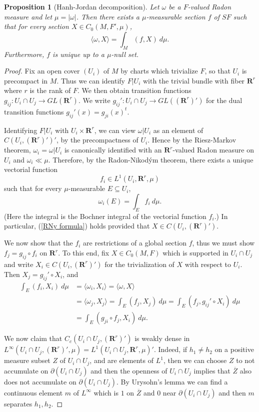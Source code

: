 \documentclass[reqno,12pt,letterpaper]{amsart}
\newcommand{\RR}{\mathbf{R}}
\newtheorem{proposition}[theorem]{Proposition}
\theoremstyle{definition}
\numberwithin{equation}{section}
\begin{document}
\begin{proposition}[Hanh-Jordan decomposition]
Let $\omega$ be a $F$-valued Radon measure and let $\mu = |\omega|$.
Then there exists a $\mu$-measurable section $f$ of $SF$ such that for every section $X \in C_0(M, F', \mu)$,
\begin{equation}\label{RNy formula}
\langle \omega, X\rangle = \int_M (f, X) ~d\mu.
\end{equation}
Furthermore, $f$ is unique up to a $\mu$-null set.
\end{proposition}
\begin{proof}
Fix an open cover $(U_i)$ of $M$ by charts which trivialize $F$, so that $U_i$ is precompact in $M$.
Thus we can identify $F|U_i$ with the trivial bundle with fiber $\RR^r$ where $r$ is the rank of $F$.
We then obtain transition functions $g_{ij}: U_i \cap U_j \to GL(\RR^r)$.
We write $g_{ij}': U_i \cap U_j \to GL((\RR^r)')$ for the dual transition functions $g_{ij}'(x) = g_{ji}(x)^t$.

Identifying $F|U_i$ with $U_i \times \RR^r$, we can view $\omega|U_i$ as an element of $C(U_i, (\RR^r)')'$, by the precompactness of $U_i$.
Hence by the Riesz-Markov theorem, $\omega_i = \omega|U_i$ is canonically identified with an $\RR^r$-valued Radon measure on $U_i$ and $\omega_i \ll \mu$.
Therefore, by the Radon-Nikod\'ym theorem, there exists a unique vectorial function
$$f_i \in L^1(U_i, \RR^r, \mu)$$
such that for every $\mu$-measurable $E \subseteq U_i$,
$$\omega_i(E) = \int_E f_i ~d\mu.$$
(Here the integral is the Bochner integral of the vectorial function $f_i$.)
In particular, (\ref{RNy formula}) holds provided that $X \in C(U_i, (\RR^r)')$.

We now show that the $f_i$ are restrictions of a global section $f$, thus we must show $f_j = g_{ij} \circ f_i$ on $\RR^r$.
To this end, fix $X \in C_0(M, F)$ which is supported in $U_i \cap U_j$ and write $X_i \in C(U_i, (\RR^r)')$ for the trivialization of $X$ with respect to $U_i$.
Then $X_j = g_{ij}' \circ X_i$, and
\begin{align*}
\int_E (f_i, X_i) ~d\mu &= \langle \omega_i, X_i\rangle = \langle \omega, X\rangle\\
&= \langle \omega_j, X_j\rangle = \int_E (f_j, X_j) ~d\mu = \int_E (f_j, g_{ij}' \circ X_i) ~d\mu \\
&= \int_E (g_{ji} \circ f_j, X_i) ~d\mu.
\end{align*}

We now claim that $C_c(U_i \cap U_j, (\RR^r)')$ is weakly dense in $L^\infty(U_i \cap U_j, (\RR^r)', \mu) = L^1(U_i \cap U_j, \RR^r, \mu)'.$
Indeed, if $h_1 \neq h_2$ on a positive measure subset $Z$ of $U_i \cap U_j$, and are elements of $L^1$, then we can choose $Z$ to not accumulate on $\partial(U_i \cap U_j)$ and then the openness of $U_i \cap U_j$ implies that $\overline Z$ also does not accumulate on $\partial(U_i \cap U_j)$.
By Urysohn's lemma we can find a continuous element $m$ of $L^\infty$ which is $1$ on $\overline Z$ and $0$ near $\partial(U_i \cap U_j)$ and then $m$ separates $h_1,h_2$.


\end{proof}
\end{document}
